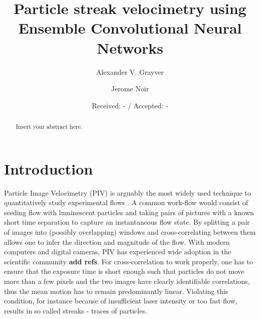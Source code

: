 \documentclass{svjour3}                     %
\begin{document}
\title{Particle streak velocimetry using Ensemble Convolutional Neural Networks}

\author{Alexander V. Grayver         \and
        Jerome Noir
}


\date{Received: - / Accepted: -}


\maketitle

\begin{abstract}
Insert your abstract here. 
\end{abstract}

\section{Introduction}
\label{sec:intro}

Particle Image Velocimetry (PIV) is arguably the most widely used technique to quantitatively study experimental flows \cite{raffel2018particle}. A common work-flow would consist of seeding flow with luminescent particles and taking pairs of pictures with a known short time separation to capture an instantaneous flow state. By splitting a pair of images into (possibly overlapping) windows and cross-correlating between them allows one to infer the direction and magnitude of the flow. With modern computers and digital cameras, PIV has experienced wide adoption in the scientific community \textbf{add refs}. For cross-correlation to work properly, one has to ensure that the exposure time is short enough such that particles do not move more than a few pixels and the two images have clearly identifiable correlations, thus the mean motion has to remain predominantly linear. Violating this condition, for instance because of insufficient laser intensity or too fast flow, results in so called streaks - traces of particles.
\end{document}
